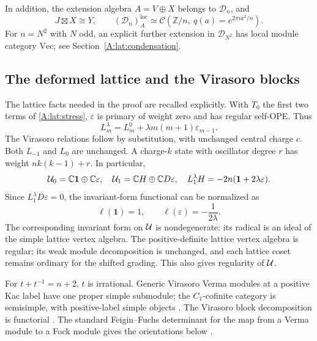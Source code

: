 \documentclass[11pt]{article}
\newcommand{\C}{\mathbb C}\newcommand{\Q}{\mathbb Q}\newcommand{\Z}{\mathbb Z}
\newcommand{\one}{\mathbf1}\newcommand{\D}{\mathcal D}\newcommand{\Dcat}{\mathcal D}
\numberwithin{equation}{section}
\begin{document}
In addition, the extension algebra $A=V\oplus X$ belongs to $\Dcat_n$, and
\[
 J\boxtimes X\cong Y,\qquad
 (\Dcat_n)^{\mathrm{loc}}_A\simeq
 \mathcal C\left(\Z/n,\ q(a)=e^{2\pi i a^2/n}\right).
\]
For $n=N^2$ with $N$ odd, an explicit further extension in $\Dcat_{N^2}$ has local module category $\mathrm{Vec}$; see Section~\ref{A:lat:condensation}. 

\subsection{The deformed lattice and the Virasoro blocks}
The lattice facts needed in the proof are recalled explicitly. With $T_0$ the first two terms of \eqref{A:lat:stress}, $\varepsilon$ is primary of weight zero and has regular self-OPE. Thus
\[
 L_m^\lambda=L_m^0+\lambda m(m+1)\varepsilon_{m-1}.
\]
The Virasoro relations follow by substitution, with unchanged central charge $c$. Both $L_{-1}$ and $L_0$ are unchanged. A charge-$k$ state with oscillator degree $r$ has weight $nk(k-1)+r$. In particular,
\[
 \U_0=\C\one\oplus\C\varepsilon,\quad
 \U_1=\C H\oplus\C D\varepsilon,\quad
 L_1^\lambda H=-2n(\one+2\lambda\varepsilon).
\]
Since $L_1^\lambda D\varepsilon=0$, the invariant-form functional can be normalized as
\begin{equation}\label{A:lat:ell}
 \ell(\one)=1,\qquad \ell(\varepsilon)=-\frac1{2\lambda}.
\end{equation}
The corresponding invariant form on $\mathcal U$ is nondegenerate: its radical is an ideal of the simple lattice vertex algebra. The positive-definite lattice vertex algebra is regular; its weak module decomposition is unchanged, and each lattice coset remains ordinary for the shifted grading. This also gives regularity of $\mathcal U$.

For $t+t^{-1}=n+2$, $t$ is irrational. Generic Virasoro Verma modules at a positive Kac label have one proper simple submodule; the $C_1$-cofinite category is semisimple, with positive-label simple objects \cite{A:CJORY}. The Virasoro block decomposition is functorial \cite{A:BNW}. The standard Feigin--Fuchs determinant for the map from a Verma module to a Fock module gives the orientations below \cite{A:FF,A:Fr}.
\end{document}
